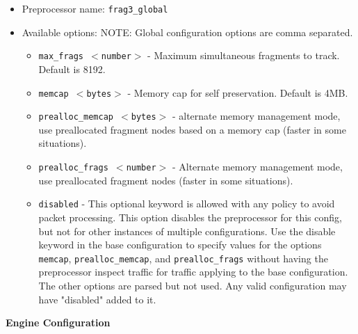 \documentclass[english]{report}
\begin{document}
\begin{itemize}

\item Preprocessor name: \texttt{frag3\_global}

\item Available options: NOTE: Global configuration options are comma
separated.

\begin{itemize}

\item \texttt{max\_frags $<$number$>$} - Maximum simultaneous fragments to
track. Default is 8192.

\item \texttt{memcap $<$bytes$>$} - Memory cap for self preservation.  Default
is 4MB.  

\item \texttt{prealloc\_memcap $<$bytes$>$} - alternate memory management mode,
use preallocated fragment nodes based on a memory cap (faster in some
situations).

\item \texttt{prealloc\_frags $<$number$>$} - Alternate memory management mode,
use preallocated fragment nodes (faster in some situations).

\item \texttt{disabled} - This optional keyword is allowed with any
policy to avoid packet processing. This option disables the preprocessor
for this config, but not for other instances of multiple configurations.
Use the disable keyword in the base configuration to specify values for the
options \texttt{memcap}, \texttt{prealloc\_memcap}, and \texttt{prealloc\_frags}
without having the preprocessor inspect traffic for traffic applying to the base
configuration.  The other options are parsed but not used. Any valid
configuration may have "disabled" added to it.

\end{itemize}                               
\end{itemize}    
 
\textbf{Engine Configuration}
\end{document}
